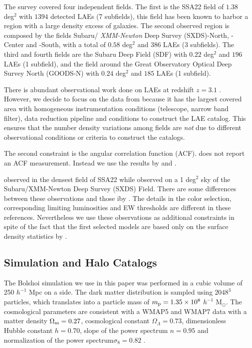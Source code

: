 \documentclass[usenatbib]{mn2e}
\begin{document}
The survey covered four independent fields. The first is the SSA22
field of $1.38$ deg$^2$ with $1394$ detected LAEs (7 subfields), this field has been
known to harbor a region with a large density excess of galaxies. The
second observed region is composed by the fields Subaru/{\it
  XMM-Newton} Deep Survey (SXDS)-North, -Center and -South, with a 
total of $0.58$ deg$^2$ and $386$ LAEs (3 subfields). The third and fourth fields
are the Subaru Deep Field (SDF) with $0.22$ deg$^2$ and $196$ LAEs (1 subfield),
and the field around the Great Observatory Optical Deep Survey North
(GOODS-N) with $0.24$ deg$^2$ and $185$ LAEs (1 subfield). 

There is abundant observational work done on LAEs at redshift $z=3.1$
\citep{Kudritzki2000,Matsuda2005,Gawiser2007,Nilsson2007,Ouchi2008}.
However, we decide to focus on the data from \cite{Yamada2012} because
it has the largest covered area with homogeneous instrumentation
conditions (telescope, narrow band filter), data reduction pipeline
and conditions to construct the LAE catalog. This ensures that the
number density variations among fields are \emph{not} due to different
observational conditions or criteria to construct the catalogs.

The second constraint is the angular correlation function
(ACF). \cite{Yamada2012} does not report an ACF measurement. Instead
we use the results by \cite{Hayashino2004} and
\cite{Ouchi2008,Ouchi2010}.  

\cite{Hayashino2004} observed in the densest field of
SSA22 while \cite{Ouchi2008} observed on a 1 deg$^2$ sky of the
Subaru/XMM-Newton Deep Survey (SXDS) Field.  There are some
differences between these observations and those iby
\cite{Yamada2012}. The details in the color selection, corresponding
limiting luminosities and EW thresholds are different in these
references. Nevertheless we use these observations as additional
constraints in spite of the fact that the first selected models are
based only on the surface density statistics by \citep{Yamada2012}.





\subsection{Simulation and Halo Catalogs}

The Bolshoi simulation \citep{Bolshoi} we use in this paper was
performed in a cubic volume of 250 $h^{-1}$ Mpc on a side. The
dark matter distribution is sampled using $2048^{3}$ particles, which
translates into a particle mass of $m_{\rm   p}=1.35\times 10^{8}$
$h^{-1}$ M$_{\odot}$.  The cosmological parameters are consistent with
a WMAP5 and WMAP7 data with a matter density $\Omega_{\rm m} = 0.27$,
cosmological constant $\Omega_{\Lambda}=0.73$, dimensionless Hubble constant
$h=0.70$, slope of the power spectrum $n=0.95$ and normalization of the
power spectrum$\sigma_{8}=0.82$ \citep{Komatsu2009,Jarosik2011}.  
\end{document}
